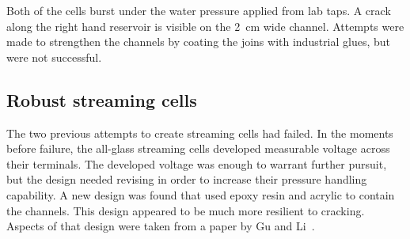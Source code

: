     Both of the cells burst under the water pressure applied from lab taps.
    A crack along the right hand reservoir is visible on the \SI{2}{\centi\meter} wide channel.
    Attempts were made to strengthen the channels by coating the joins with industrial glues, but were not successful.


  \subsection{Robust streaming cells}


    The two previous attempts to create streaming cells had failed.
    In the moments before failure, the all-glass streaming cells developed measurable voltage across their terminals.
    The developed voltage was enough to warrant further pursuit, but the design needed revising in order to increase their pressure handling capability.
    A new design was found that used epoxy resin and acrylic to contain the channels.
    This design appeared to be much more resilient to cracking.
    Aspects of that design were taken from a paper by Gu and Li~\cite{Gu2000}.

